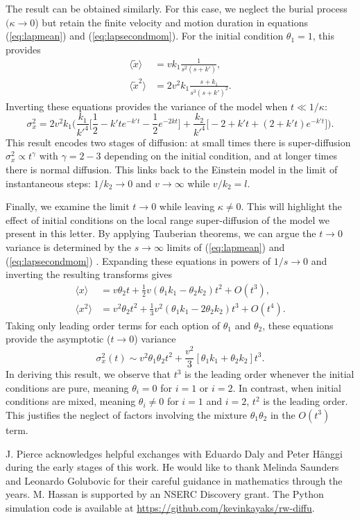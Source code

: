 \documentclass[]{agujournal2018}
\newcommand\be{\begin{equation}}
\newcommand\ee{\end{equation}}
\newcommand\bra{\langle}
\newcommand\ket{\rangle}
\begin{document}
The \citet{Lisle1998} result can be obtained similarly. For this case, we neglect the burial process $(\kappa \rightarrow 0$) but retain the finite velocity and motion duration in equations (\ref{eq:lapmean}) and (\ref{eq:lapsecondmom}).
For the initial condition $\theta_1=1$, this provides 
\begin{align}
\bra \tilde{x} \ket &= vk_1 \frac{1 }{s^2(s+k')}, \label{eq:li1}\\
\bra \tilde{x}^2 \ket &= 2v^2k_1 \frac{s+k_1}{s^3(s+k')^2}. \label{eq:li2}
\end{align}
Inverting these equations provides the variance of the model when $t\ll 1/\kappa$:
\be \sigma_x^2 = 2v^2k_1\Big(\frac{k_1}{k'^4}\big[\frac{1}{2} - k'te^{-k't} - \frac{1}{2} e^{-2kt}\big] + \frac{k_2}{k'^4}\big[-2+k't + (2+k't)e^{-k't}\big]\Big).\ee
This result encodes two stages of diffusion: at small times there is super-diffusion $\sigma_x^2 \propto t^\gamma$ with $\gamma = 2-3$ depending on the initial condition, and at longer times there is normal diffusion. This links back to the Einstein model in the limit of instantaneous steps: $1/k_2 \rightarrow 0$ and $v\rightarrow \infty$ while $v/k_2 = l$.

Finally, we examine the limit $t\rightarrow 0 $ while leaving $\kappa \neq 0$. This will highlight the effect of initial conditions on the local range super-diffusion of the model we present in this letter.
By applying Tauberian theorems, we can argue the $ t \rightarrow 0$ variance is determined by the $s\rightarrow \infty$ limits of (\ref{eq:lapmean}) and (\ref{eq:lapsecondmom}) \citep[e.g.][]{Weiss1994, Weeks1998}.  Expanding these equations in powers of $1/s \rightarrow 0$ and inverting the resulting transforms gives
\begin{align} \bra x \ket &= v \theta_2 t + \frac{1}{2}v(\theta_1k_1-\theta_2k_2)t^2 + O(t^3),\\
\bra x^2 \ket &= v^2\theta_2 t^2 + \frac{1}{3}v^2(\theta_1k_1-2\theta_2k_2)t^3+ O(t^4).
\end{align}
Taking only leading order terms for each option of $\theta_1$ and $\theta_2$, these equations provide the asymptotic ($t\rightarrow 0$) variance 
\be \sigma_x^2(t) \sim v^2\theta_1\theta_2t^2 + \frac{v^2}{3}[\theta_1k_1+\theta_2k_2]t^3.\ee
In deriving this result, we observe that $t^3$ is the leading order whenever the initial conditions are pure, meaning $\theta_i=0$ for $i=1$ or $i=2$. 
In contrast, when initial conditions are mixed, meaning $\theta_i \neq 0$ for $i=1$ and $i=2$, $t^2$ is the leading order.
This justifies the neglect of factors involving the mixture $\theta_1\theta_2$ in the $O(t^3)$ term. 

\acknowledgments
J. Pierce acknowledges helpful exchanges with Eduardo Daly and Peter H{\"a}nggi during the early stages of this work. He would like to thank Melinda Saunders and Leonardo Golubovic for their careful guidance in mathematics through the years. M. Hassan is supported by an NSERC Discovery grant. The Python simulation code is available at \sloppy
\url{https://github.com/kevinkayaks/rw-diffu}.


\end{document}
